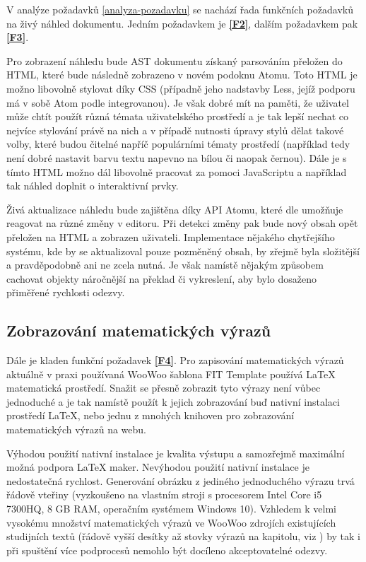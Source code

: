 V analýze požadavků \ref{analyza-pozadavku} se nachází řada funkčních požadavků na živý náhled dokumentu. Jedním
požadavkem je \textbf{\ref{F2}}, dalším požadavkem pak \textbf{\ref{F3}}.

Pro zobrazení náhledu bude AST dokumentu získaný parsováním přeložen do HTML, které bude následně zobrazeno v novém
podoknu Atomu. Toto HTML je možno libovolně stylovat díky CSS (případně jeho nadstavby Less, jejíž podporu má v sobě
Atom podle \cite{atom-docs} integrovanou). Je však dobré mít na paměti, že uživatel může chtít použít různá témata
uživatelského prostředí a je tak lepší nechat co nejvíce stylování právě na nich a v případě nutnosti úpravy stylů dělat
takové volby, které budou čitelné napříč populárními tématy prostředí (například tedy není dobré nastavit barvu textu
napevno na bílou či naopak černou). Dále je s tímto HTML možno dál libovolně pracovat za pomoci JavaScriptu a například
tak náhled doplnit o interaktivní prvky.

Živá aktualizace náhledu bude zajištěna díky API Atomu, které dle \cite{atom-docs} umožňuje reagovat na různé změny v
editoru. Při detekci změny pak bude nový obsah opět přeložen na HTML a zobrazen uživateli. Implementace nějakého
chytřejšího systému, kde by se aktualizoval pouze pozměněný obsah, by zřejmě byla složitější a pravděpodobně ani ne
zcela nutná. Je však namístě nějakým způsobem cachovat objekty náročnější na překlad či vykreslení, aby bylo dosaženo
přiměřené rychlosti odezvy.

\subsection{Zobrazování matematických výrazů}
\label{zobrazovani-matematickych-vyrazu}

Dále je kladen funkční požadavek \textbf{\ref{F4}}. Pro zapisování matematických výrazů aktuálně v praxi používaná
WooWoo šablona FIT Template používá \LaTeX{} matematická prostředí. Snažit se přesně zobrazit tyto výrazy není vůbec
jednoduché a je tak namístě použít k jejich zobrazování buď nativní instalaci prostředí \LaTeX{}, nebo jednu z mnohých
knihoven pro zobrazování matematických výrazů na webu.

Výhodou použití nativní instalace je kvalita výstupu a samozřejmě maximální možná podpora \LaTeX{} maker. Nevýhodou
použití nativní instalace je nedostatečná rychlost. Generování obrázku z jediného jednoduchého výrazu trvá řádově
vteřiny (vyzkoušeno na vlastním stroji s procesorem Intel Core i5 7300HQ, 8 GB RAM, operačním systémem Windows 10).
Vzhledem k velmi vysokému množství matematických výrazů ve WooWoo zdrojích existujících studijních textů (řádově vyšší
desítky až stovky výrazů na kapitolu, viz \cite{pkm}) by tak i při spuštění více podprocesů nemohlo být docíleno
akceptovatelné odezvy.

